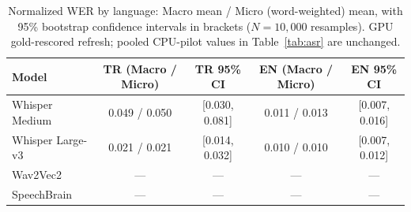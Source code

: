 \begin{table}[t]
\caption{Normalized WER by language: Macro mean / Micro (word-weighted) mean, with 95\% bootstrap confidence intervals in brackets ($N=10{,}000$ resamples). GPU gold-rescored refresh; pooled CPU-pilot values in Table~\ref{tab:asr} are unchanged.}
\label{tab:asr-lang}
\centering
\renewcommand{\arraystretch}{1.15}
\setlength{\tabcolsep}{3.0pt}
\begin{tabular}{lcccc}
\toprule
\textbf{Model} & \textbf{TR (Macro / Micro)} & \textbf{TR 95\% CI} & \textbf{EN (Macro / Micro)} & \textbf{EN 95\% CI} \\
\midrule
Whisper Medium & 0.049 / 0.050 & [0.030, 0.081] & 0.011 / 0.013 & [0.007, 0.016] \\
Whisper Large-v3 & 0.021 / 0.021 & [0.014, 0.032] & 0.010 / 0.010 & [0.007, 0.012] \\
Wav2Vec2 & --- & --- & --- & --- \\
SpeechBrain & --- & --- & --- & --- \\
\bottomrule
\end{tabular}
\end{table}
